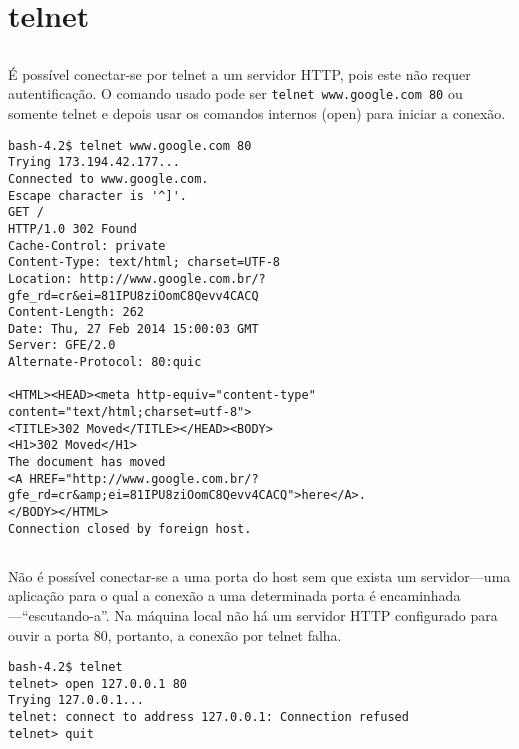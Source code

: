 \documentclass[a4paper,10pt,oneside,final,titlepage,onecolumn]{article}
\begin{document}
\section{telnet}

\subsection{}
\paragraph{}É possível conectar-se por telnet a um servidor HTTP, pois este não requer autentificação. O comando usado pode ser \verb|telnet www.google.com 80| ou somente telnet e depois usar os comandos internos (open) para iniciar a conexão.
\begin{lstlisting}
bash-4.2$ telnet www.google.com 80
Trying 173.194.42.177...
Connected to www.google.com.
Escape character is '^]'.
GET /
HTTP/1.0 302 Found
Cache-Control: private
Content-Type: text/html; charset=UTF-8
Location: http://www.google.com.br/?gfe_rd=cr&ei=81IPU8ziOomC8Qevv4CACQ
Content-Length: 262
Date: Thu, 27 Feb 2014 15:00:03 GMT
Server: GFE/2.0
Alternate-Protocol: 80:quic

<HTML><HEAD><meta http-equiv="content-type" content="text/html;charset=utf-8">
<TITLE>302 Moved</TITLE></HEAD><BODY>
<H1>302 Moved</H1>
The document has moved
<A HREF="http://www.google.com.br/?gfe_rd=cr&amp;ei=81IPU8ziOomC8Qevv4CACQ">here</A>.
</BODY></HTML>
Connection closed by foreign host.
\end{lstlisting}

\subsection{}Não é possível conectar-se a uma porta do host sem que exista um servidor---uma aplicação para o qual a conexão a uma determinada porta é encaminhada---``escutando-a''. Na máquina local não há um servidor HTTP configurado para ouvir a porta 80, portanto, a conexão por telnet falha.
\begin{lstlisting}
bash-4.2$ telnet
telnet> open 127.0.0.1 80
Trying 127.0.0.1...
telnet: connect to address 127.0.0.1: Connection refused
telnet> quit
\end{lstlisting}
\end{document}
